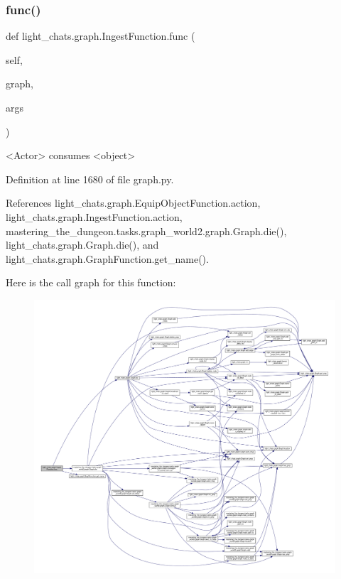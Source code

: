 \subsubsection{\texorpdfstring{func()}{func()}}
{\footnotesize\ttfamily def light\+\_\+chats.\+graph.\+Ingest\+Function.\+func (\begin{DoxyParamCaption}\item[{}]{self,  }\item[{}]{graph,  }\item[{}]{args }\end{DoxyParamCaption})}

\begin{DoxyVerb}<Actor> consumes <object>\end{DoxyVerb}
 

Definition at line 1680 of file graph.\+py.



References light\+\_\+chats.\+graph.\+Equip\+Object\+Function.\+action, light\+\_\+chats.\+graph.\+Ingest\+Function.\+action, mastering\+\_\+the\+\_\+dungeon.\+tasks.\+graph\+\_\+world2.\+graph.\+Graph.\+die(), light\+\_\+chats.\+graph.\+Graph.\+die(), and light\+\_\+chats.\+graph.\+Graph\+Function.\+get\+\_\+name().

Here is the call graph for this function\+:
\nopagebreak
\begin{figure}[H]
\begin{center}
\leavevmode
\includegraphics[width=350pt]{classlight__chats_1_1graph_1_1IngestFunction_acf3afc20e4e55a9bd2783d2bad592a88_cgraph}
\end{center}
\end{figure}
\mbox{\label{classlight__chats_1_1graph_1_1IngestFunction_aae6cb9fc171d5a59c3d2bafae9ed58b7}} 
